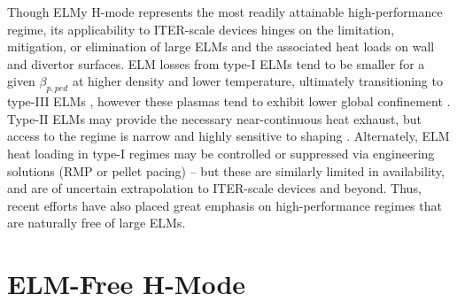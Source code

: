 Though ELMy H-mode represents the most readily attainable high-performance regime, its applicability to ITER-scale devices hinges on the limitation, mitigation, or elimination of large ELMs and the associated heat loads on wall and divertor surfaces.  ELM losses from type-I ELMs tend to be smaller for a given $\beta_{p,ped}$ at higher density and lower temperature, ultimately transitioning to type-III ELMs \cite{Urano2003}, however these plasmas tend to exhibit lower global confinement \cite{Saibene1999}.  Type-II ELMs may provide the necessary near-continuous heat exhaust, but access to the regime is narrow and highly sensitive to shaping \cite{Suttrop2003}.  Alternately, ELM heat loading in type-I regimes may be controlled or suppressed via engineering solutions (\ie RMP or pellet pacing) -- but these are similarly limited in availability, and are of uncertain extrapolation to ITER-scale devices and beyond.  Thus, recent efforts have also placed great emphasis on high-performance regimes that are naturally free of large ELMs.\nicesectionending

\section{ELM-Free H-Mode}\label{sec:hcr_elmfree}

